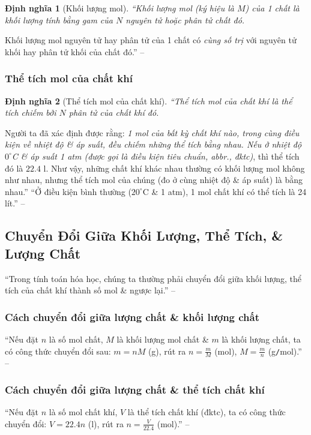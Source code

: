 \documentclass{article}
\numberwithin{equation}{section}
\newtheorem{dinhnghia}{Định nghĩa}[section]
\begin{document}
\begin{dinhnghia}[Khối lượng mol]
	``\emph{Khối lượng mol} (ký hiệu là $M$) của 1 chất là khối lượng tính bằng gam của $N$ nguyên tử hoặc phân tử chất đó.
\end{dinhnghia}
Khối lượng mol nguyên tử hay phân tử của 1 chất có \textit{cùng số trị} với nguyên tử khối hay phân tử khối của chất đó.'' -- \cite[p. 63]{SGK_Hoa_Hoc_8}

\subsubsection{Thể tích mol của chất khí}

\begin{dinhnghia}[Thể tích mol của chất khí]
	``\emph{Thể tích mol của chất khí} là thể tích chiếm bởi $N$ phân tử của chất khí đó.
\end{dinhnghia}
Người ta đã xác định được rằng: \textit{1 mol của bất kỳ chất khí nào, trong cùng điều kiện về nhiệt độ \& áp suất, đều chiếm những thể tích bằng nhau. Nếu ở nhiệt độ $0^\circ$C \& áp suất 1 atm (được gọi là \emph{điều kiện tiêu chuẩn}, abbr., \emph{đktc})}, thì thể tích đó là $22.4$ l. Như vậy, những chất khí khác nhau thường có khối lượng mol không như nhau, nhưng thể tích mol của chúng (đo ở cùng nhiệt độ \& áp suất) là bằng nhau.'' ``Ở điều kiện bình thường ($20^\circ$C \& 1 atm), 1 mol chất khí có thể tích là 24 lít.'' -- \cite[pp. 63--64]{SGK_Hoa_Hoc_8}


\subsection{Chuyển Đổi Giữa Khối Lượng, Thể Tích, \& Lượng Chất}
``Trong tính toán hóa học, chúng ta thường phải chuyển đổi giữa khối lượng, thể tích của chất khí thành số mol \& ngược lại.'' -- \cite[p. 66]{SGK_Hoa_Hoc_8}

\subsubsection{Cách chuyển đổi giữa lượng chất \& khối lượng chất}
``Nếu đặt $n$ là số mol chất, $M$ là khối lượng mol chất \& $m$ là khối lượng chất, ta có công thức chuyển đổi sau: $m = nM$ (g), rút ra $n = \frac{m}{M}$ (mol), $M = \frac{m}{n}$ (g\texttt{/}mol).'' -- \cite[p. 66]{SGK_Hoa_Hoc_8}

\subsubsection{Cách chuyển đổi giữa lượng chất \& thể tích chất khí}
``Nếu đặt $n$ là số mol chất khí, $V$ là thể tích chất khí (đktc), ta có công thức chuyển đổi: $V = 22.4n$ (l), rút ra $n = \frac{V}{22.4}$ (mol).'' -- \cite[p. 66]{SGK_Hoa_Hoc_8}
\vspace{2mm}
\end{document}
